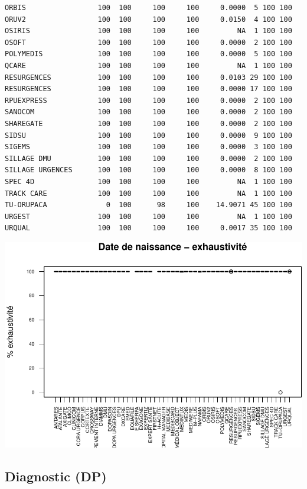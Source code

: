 \documentclass[]{article}
\begin{document}
\begin{verbatim}
ORBIS                 100  100     100     100     0.0000  5 100 100
ORUV2                 100  100     100     100     0.0150  4 100 100
OSIRIS                100  100     100     100         NA  1 100 100
OSOFT                 100  100     100     100     0.0000  2 100 100
POLYMEDIS             100  100     100     100     0.0000  5 100 100
QCARE                 100  100     100     100         NA  1 100 100
RESURGENCES           100  100     100     100     0.0103 29 100 100
RESURGENCES           100  100     100     100     0.0000 17 100 100
RPUEXPRESS            100  100     100     100     0.0000  2 100 100
SANOCOM               100  100     100     100     0.0000  2 100 100
SHAREGATE             100  100     100     100     0.0000  2 100 100
SIDSU                 100  100     100     100     0.0000  9 100 100
SIGEMS                100  100     100     100     0.0000  3 100 100
SILLAGE DMU           100  100     100     100     0.0000  2 100 100
SILLAGE URGENCES      100  100     100     100     0.0000  8 100 100
SPEC 4D               100  100     100     100         NA  1 100 100
TRACK CARE            100  100     100     100         NA  1 100 100
TU-ORUPACA              0  100      98     100    14.9071 45 100 100
URGEST                100  100     100     100         NA  1 100 100
URQUAL                100  100     100     100     0.0017 35 100 100
\end{verbatim}

\includegraphics{septembre2015_files/figure-latex/unnamed-chunk-20-1.pdf}

\subsection{Diagnostic (DP)}\label{diagnostic-dp}
\end{document}
